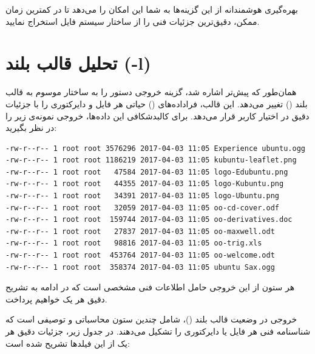 بهره‌گیری هوشمندانه از این گزینه‌ها به شما این امکان را می‌دهد تا در کمترین زمان ممکن، دقیق‌ترین جزئیات فنی را از ساختار سیستم فایل استخراج نمایید.

\section{تحلیل قالب بلند (-l)}

همان‌طور که پیش‌تر اشاره شد، گزینه  خروجی دستور  را به ساختار موسوم به قالب بلند () تغییر می‌دهد. این قالب، فراداده‌های () حیاتی هر فایل و دایرکتوری را با جزئیات دقیق در اختیار کاربر قرار می‌دهد. برای کالبدشکافی این داده‌ها، خروجی نمونه‌ی زیر را در نظر بگیرید:

\begin{latin}
\begin{lstlisting}
-rw-r--r-- 1 root root 3576296 2017-04-03 11:05 Experience ubuntu.ogg
-rw-r--r-- 1 root root 1186219 2017-04-03 11:05 kubuntu-leaflet.png
-rw-r--r-- 1 root root   47584 2017-04-03 11:05 logo-Edubuntu.png
-rw-r--r-- 1 root root   44355 2017-04-03 11:05 logo-Kubuntu.png
-rw-r--r-- 1 root root   34391 2017-04-03 11:05 logo-Ubuntu.png
-rw-r--r-- 1 root root   32059 2017-04-03 11:05 oo-cd-cover.odf
-rw-r--r-- 1 root root  159744 2017-04-03 11:05 oo-derivatives.doc
-rw-r--r-- 1 root root   27837 2017-04-03 11:05 oo-maxwell.odt
-rw-r--r-- 1 root root   98816 2017-04-03 11:05 oo-trig.xls
-rw-r--r-- 1 root root  453764 2017-04-03 11:05 oo-welcome.odt
-rw-r--r-- 1 root root  358374 2017-04-03 11:05 ubuntu Sax.ogg
\end{lstlisting}
\end{latin}

هر ستون از این خروجی حامل اطلاعات فنی مشخصی است که در ادامه به تشریح دقیق هر یک خواهیم پرداخت.

خروجی در وضعیت قالب بلند ()، شامل چندین ستون محاسباتی و توصیفی است که شناسنامه فنی هر فایل یا دایرکتوری را تشکیل می‌دهند. در جدول زیر، جزئیات دقیق هر یک از این فیلدها تشریح شده است:

